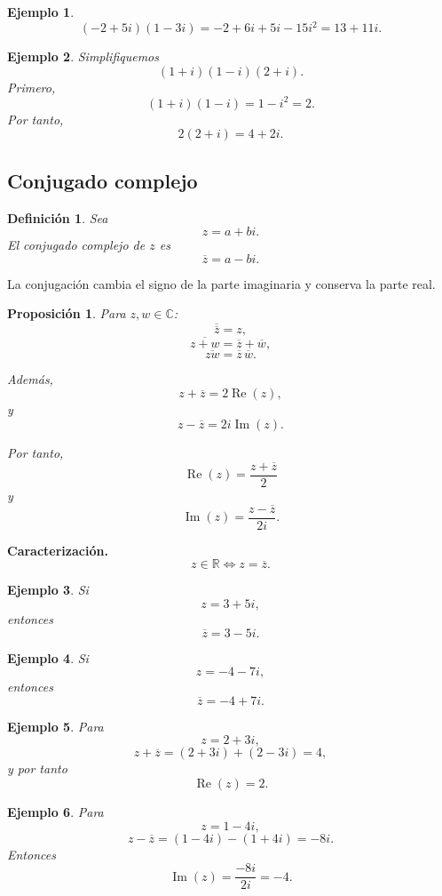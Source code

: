 \documentclass[12pt]{article}
\newtheorem{Ejem}{Ejemplo}
\newtheorem{Prop}{Proposici\'on}
\newtheorem{Def}{Definici\'on}
\begin{document}
\begin{Ejem}
\[
(-2+5i)(1-3i)
=
-2+6i+5i-15i^2
=
\boxed{13+11i}.
\]

\end{Ejem}

\begin{Ejem}
Simplifiquemos
\[
(1+i)(1-i)(2+i).
\]
Primero,
\[
(1+i)(1-i)=1-i^2=2.
\]
Por tanto,
\[
2(2+i)
=
\boxed{4+2i}.
\]
\end{Ejem}


\subsection*{Conjugado complejo}

\begin{Def}
Sea
\[
z=a+bi.
\]
El \emph{conjugado complejo} de $z$ es
\[
\boxed{\overline z=a-bi.}
\]
\end{Def}

La conjugación cambia el signo de la parte imaginaria y conserva la parte real.

\begin{Prop}
Para $z,w\in\mathbb{C}$:
\[
\boxed{\overline{\overline z}=z,}
\]
\[
\boxed{\overline{z+w}=\overline z+\overline w,}
\]
\[
\boxed{\overline{zw}=\overline z\,\overline w.}
\]

Además,
\[
z+\overline z=2\operatorname{Re}(z),
\]
y
\[
z-\overline z=2i\operatorname{Im}(z).
\]

Por tanto,
\[
\boxed{
\operatorname{Re}(z)
=
\frac{z+\overline z}{2}
}
\]
y
\[
\boxed{
\operatorname{Im}(z)
=
\frac{z-\overline z}{2i}.
}
\]
\end{Prop}
\textbf{Caracterización.}
\[
z\in\mathbb{R}
\iff
z=\overline z.
\]

\begin{Ejem}
Si
\[
z=3+5i,
\]
entonces
\[
\overline z=3-5i.
\]
\end{Ejem}

\begin{Ejem}
Si
\[
z=-4-7i,
\]
entonces
\[
\overline z=-4+7i.
\]
\end{Ejem}

\begin{Ejem}
Para
\[
z=2+3i,
\]
\[
z+\overline z
=
(2+3i)+(2-3i)
=
4,
\]
y por tanto
\[
\operatorname{Re}(z)=2.
\]
\end{Ejem}

\begin{Ejem} Para
\[
z=1-4i,
\]
\[
z-\overline z
=
(1-4i)-(1+4i)
=
-8i.
\]
Entonces
\[
\operatorname{Im}(z)
=
\frac{-8i}{2i}
=
-4.
\]
\end{Ejem}
\end{document}
